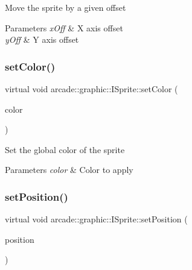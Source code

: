 Move the sprite by a given offset 
\begin{DoxyParams}{Parameters}
{\em x\+Off} & X axis offset \\
\hline
{\em y\+Off} & Y axis offset \\
\hline
\end{DoxyParams}
\mbox{\label{classarcade_1_1graphic_1_1_i_sprite_a3746d3ae251a8377d4156c27dfe66a8c}} 
\subsubsection{\texorpdfstring{setColor()}{setColor()}}
{\footnotesize\ttfamily virtual void arcade\+::graphic\+::\+I\+Sprite\+::set\+Color (\begin{DoxyParamCaption}\item[{const \mbox{\hyperlink{classarcade_1_1graphic_1_1_i_color}{I\+Color}} \&}]{color }\end{DoxyParamCaption})\hspace{0.3cm}{\ttfamily [pure virtual]}}

Set the global color of the sprite 
\begin{DoxyParams}{Parameters}
{\em color} & Color to apply \\
\hline
\end{DoxyParams}
\mbox{\label{classarcade_1_1graphic_1_1_i_sprite_a51a53315af10283b414cb318a0a940ff}} 
\subsubsection{\texorpdfstring{setPosition()}{setPosition()}}
{\footnotesize\ttfamily virtual void arcade\+::graphic\+::\+I\+Sprite\+::set\+Position (\begin{DoxyParamCaption}\item[{const \mbox{\hyperlink{classarcade_1_1graphic_1_1_i_vector2f}{I\+Vector2f}} \&}]{position }\end{DoxyParamCaption})\hspace{0.3cm}{\ttfamily [pure virtual]}}

